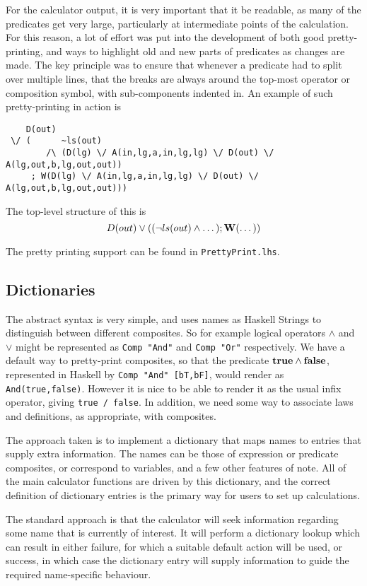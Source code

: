 For the calculator output,
it is very important that it be readable,
as many of the predicates get very large,
particularly at intermediate points of the calculation.
For this reason, a lot of effort was put into the development
of both good pretty-printing,
and ways to highlight old and new parts of predicates as changes are made.
The key principle was to ensure that whenever a predicate
had to split over multiple lines,
that the breaks are always around the top-most operator or composition
symbol, with sub-components indented in.
An example of such pretty-printing in action is

{\small
\begin{verbatim}
    D(out)
 \/ (      ~ls(out)
        /\ (D(lg) \/ A(in,lg,a,in,lg,lg) \/ D(out) \/ A(lg,out,b,lg,out,out))
     ; W(D(lg) \/ A(in,lg,a,in,lg,lg) \/ D(out) \/ A(lg,out,b,lg,out,out)))
\end{verbatim}
}
The top-level structure of this is
\[D(out) \lor ( (\lnot ls(out) \land \dots) ; \mathbf{W}(\dots) )\]

The pretty printing support can be found in \texttt{PrettyPrint.lhs}.

\subsection{Dictionaries}\label{ssec:dict}

The abstract syntax is very simple,
and uses names as Haskell Strings to distinguish between
different composites.
So for example logical operators $\land$ and $\lor$
might be represented as \texttt{Comp "And"} and \texttt{Comp "Or"}
respectively.
We have a default way to pretty-print composites,
so that the predicate $\mathbf{true} \land \mathbf{false}$,
represented in Haskell by \texttt{Comp "And" [bT,bF]},
would render as \texttt{And(true,false)}.
However it is nice to be able to render it as the usual
infix operator, giving \texttt{true /\BS\ false}.
In addition, we need some way to associate laws and definitions,
as appropriate, with composites.

The approach taken is to implement a dictionary that maps names
to entries that supply extra information.
The names can be those of expression or predicate composites,
or correspond to variables, and a few other features of note.
All of the main calculator functions are driven by this
dictionary,
and the correct definition of dictionary entries
is the primary way for users to set up calculations.

The standard approach is that the calculator
will seek information regarding some name that is
currently of interest.
It will perform a dictionary lookup which can result
in either failure, for which a suitable default action will be used,
or success, in which case the dictionary entry will supply
information to guide the required name-specific behaviour.

